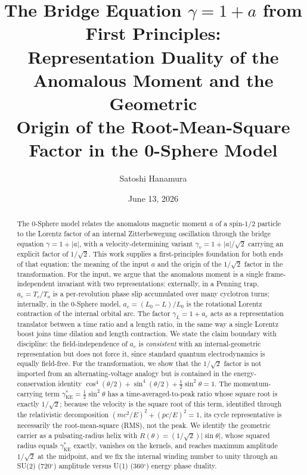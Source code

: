 \documentclass[%
 reprint, amsmath,amssymb, aps, prb, ]{revtex4-2}
\numberwithin{equation}{section}
\newcommand{\gKE}{\gamma^{*}_{\text{KE}}}
\begin{document}
\title{The Bridge Equation $\gamma = 1 + a$ from First Principles:\\
Representation Duality of the Anomalous Moment and the Geometric\\
Origin of the Root-Mean-Square Factor in the 0-Sphere Model}

\author{Satoshi Hanamura}
\date{June 13, 2026}

\begin{abstract}
The 0-Sphere model relates the anomalous magnetic moment $a$ of a spin-$1/2$ particle to the Lorentz factor of an internal Zitterbewegung oscillation through the bridge equation $\gamma = 1 + \lvert a\rvert$, with a velocity-determining variant $\gamma_v = 1 + \lvert a\rvert/\sqrt{2}$ carrying an explicit factor of $1/\sqrt{2}$.
This work supplies a first-principles foundation for both ends of that equation: the meaning of the input $a$ and the origin of the $1/\sqrt{2}$ factor in the transformation.
For the input, we argue that the anomalous moment is a single frame-independent invariant with two representations: externally, in a Penning trap, $a_e = T_c/T_a$ is a per-revolution phase slip accumulated over many cyclotron turns; internally, in the 0-Sphere model, $a_e = (L_0 - L)/L_0$ is the rotational Lorentz contraction of the internal orbital arc.
The factor $\gamma_L = 1 + a_e$ acts as a representation translator between a time ratio and a length ratio, in the same way a single Lorentz boost joins time dilation and length contraction.
We state the claim boundary with discipline: the field-independence of $a_e$ is \emph{consistent} with an internal-geometric representation but does not force it, since standard quantum electrodynamics is equally field-free.
For the transformation, we show that the $1/\sqrt{2}$ factor is not imported from an alternating-voltage analogy but is contained in the energy-conservation identity $\cos^4(\theta/2)+\sin^4(\theta/2)+\tfrac{1}{2}\sin^2\theta = 1$.
The momentum-carrying term $\gKE = \tfrac{1}{2}\sin^2\theta$ has a time-averaged-to-peak ratio whose square root is exactly $1/\sqrt{2}$; because the velocity is the square root of this term, identified through the relativistic decomposition $(mc^2/E)^2 + (pc/E)^2 = 1$, its cycle representative is necessarily the root-mean-square (RMS), not the peak.
We identify the geometric carrier as a pulsating-radius helix with $R(\theta)=(1/\sqrt{2})\lvert\sin\theta\rvert$, whose squared radius equals $\gKE$ exactly, vanishes on the kernels, and reaches maximum amplitude $1/\sqrt{2}$ at the midpoint, and we fix the internal winding number to unity through an SU(2) (720$^\circ$) amplitude versus U(1) (360$^\circ$) energy phase duality.

\end{abstract}
\end{document}
